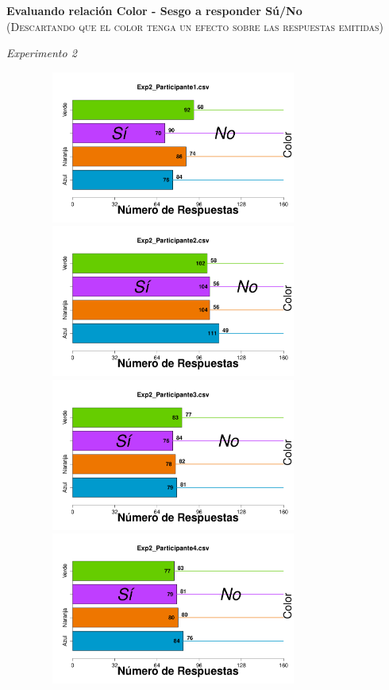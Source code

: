 \documentclass[a4paper ]{article}
\begin{document}
\begin{center}
{\LARGE \textbf{Evaluando relación Color - Sesgo a responder Sú/No}}\\
{\small \textsc{(Descartando que el color tenga un efecto sobre las respuestas emitidas)}}\\
\smallskip
\end{center}
\begin{center}
{\LARGE \textit{Experimento 2}}\\
\end{center}
\vspace{3mm}
\begin{figure}[th]
\centering
\includegraphics[width=9cm, height=5cm]{Figures/BiasColor_Exp2_P1} \includegraphics[width=9cm, height=5cm]{Figures/BiasColor_Exp2_P2} 
\includegraphics[width=9cm, height=5cm]{Figures/BiasColor_Exp2_P3} \includegraphics[width=9cm, height=5cm]{Figures/BiasColor_Exp2_P4} 

\end{figure}
\end{document}
